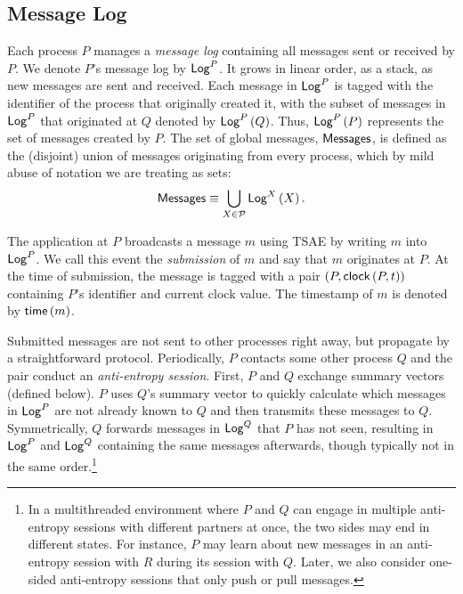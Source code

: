 \documentclass[]             %
{NASA}                       %
\theoremstyle{definition}
\begin{document}
\subsection{Message Log}
\label{ssec:tsae-message-log}
Each process $P$ manages a \emph{message log} containing all messages
sent or received by $P$. We denote $P$'s message log by $\mathsf{Log}^{P}$. It
grows in linear order, as a stack, as new messages are sent and
received. Each message in $\mathsf{Log}^{P}$ is tagged with the identifier of
the process that originally created it, with the subset of messages in
$\mathsf{Log}^{P}$ that originated at $Q$ denoted by $\mathsf{Log}^{P}\left(Q\right)$. Thus,
$\mathsf{Log}^{P}\left(P\right)$ represents the set of messages created by $P$. The set
of global messages, $\mathbf{\mathsf{Messages}}$, is defined as the (disjoint) union of
messages originating from every process, which by mild abuse of
notation we are treating as sets:
\[\mathbf{\mathsf{Messages}} \equiv \bigcup_{X \in \mathcal{P}} \mathsf{Log}^{X}\left(X\right).\]

The application at $P$ broadcasts a message $m$ using TSAE by writing
$m$ into $\mathsf{Log}^{P}$. We call this event the \emph{submission} of $m$ and
say that $m$ originates at $P$. At the time of submission, the message
is tagged with a pair $(P, \mathsf{clock}\left(P,t\right))$ containing $P$'s identifier
and current clock value. The timestamp of $m$ is denoted by
$\mathsf{time}\left(m\right)$.

Submitted messages are not sent to other processes right away, but
propagate by a straightforward protocol. Periodically, $P$ contacts
some other process $Q$ and the pair conduct an \emph{anti-entropy
  session}. First, $P$ and $Q$ exchange summary vectors (defined
below). $P$ uses $Q$'s summary vector to quickly calculate which
messages in $\mathsf{Log}^{P}$ are not already known to $Q$ and then transmits
these messages to $Q$. Symmetrically, $Q$ forwards messages in
$\mathsf{Log}^{Q}$ that $P$ has not seen, resulting in $\mathsf{Log}^{P}$ and $\mathsf{Log}^{Q}$
containing the same messages afterwards, though typically not in the
same order.\footnote{In a multithreaded environment where $P$ and $Q$
  can engage in multiple anti-entropy sessions with different partners
  at once, the two sides may end in different states. For instance,
  $P$ may learn about new messages in an anti-entropy session with $R$
  during its session with $Q$. Later, we also consider one-sided
  anti-entropy sessions that only push or pull messages. }
\end{document}
